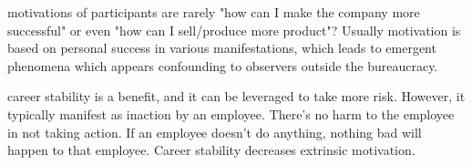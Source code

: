 motivations of participants are rarely "how can I make the company more successful" or even "how can I sell/produce more product"? Usually motivation is based on personal success in various manifestations, which leads to emergent phenomena which appears confounding to observers outside the bureaucracy. 



career stability is a benefit, and it can be leveraged to take more risk. However, it typically manifest as inaction by an employee. There's no harm to the employee in not taking action. If an employee doesn't do anything, nothing bad will happen to that employee. Career stability decreases extrinsic motivation.